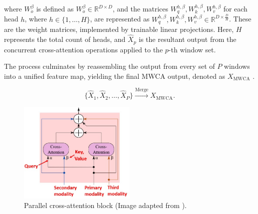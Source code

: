 \documentclass[report.tex]{subfiles}
\begin{document}


        where \( W^{\beta}_o \) is defined as \( W^{\beta}_o \in \mathbb{R}^{D \times D} \), and the matrices \( W^{h,\beta}_q, W^{h,\beta}_k, W^{h,\beta}_v \) for each head \( h \), where \( h \in \{1, \ldots, H\} \), are represented as \( W^{h,\beta}_q, W^{h,\beta}_k, W^{h,\beta}_v \in \mathbb{R}^{D \times \frac{D}{H}} \). These are the weight matrices, implemented by trainable linear projections. Here, \( H \) represents the total count of heads, and \( \hat{X}_p \) is the resultant output from the concurrent cross-attention operations applied to the \( p \)-th window set.

        The process culminates by reassembling the output from every set of \( P \) windows into a unified feature map, yielding the final MWCA output, denoted as \( X_{\text{MWCA}} \) \cite{broedermann2022hrfuser}.

        \begin{equation}
            \{\hat{X}_1, \hat{X}_2, \ldots, \hat{X}_P\} \xrightarrow{\text{Merge}} X_{\text{MWCA}}.
        \end{equation}


    \begin{figure}[h]
        \centering
        \includegraphics[width=0.5\textwidth]{images/methods/hrfuser/cross_attention_block_annotated.png}
        \caption{Parallel cross-attention block (Image adapted from \cite{broedermann2022hrfuser}).}
        \label{fig:hrfuser_cross_attention_block}
    \end{figure}
\end{document}
